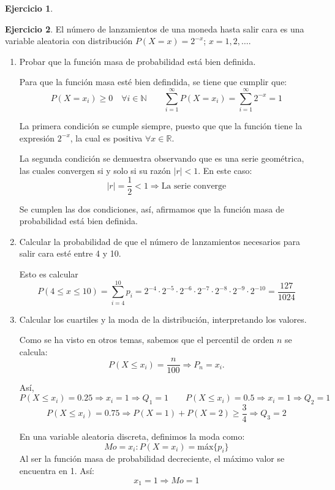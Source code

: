 \documentclass[a4paper, 12pt]{article}
\theoremstyle{definition}
\newtheorem{ej}{Ejercicio}
\begin{document}
\newpage

\begin{ej}

\end{ej}

\begin{ej}
El número de lanzamientos de una moneda hasta salir cara es una variable aleatoria con distribución \(P(X=x) = 2^{-x}\); \(x=1,2,\dotsc\).

\begin{enumerate}[label=\textit{\alph*)}]
	\item Probar que la función masa de probabilidad está bien definida.
	
Para que la función masa esté bien defindida, se tiene que cumplir que:
\[
	P(X=x_i) \geq 0 \quad \forall i \in \mathbb{N} \qquad \sum_{i=1}^{\infty} P(X=x_i) = \sum_{i=1}^{\infty} 2^{-x} = 1
\]

La primera condición se cumple siempre, puesto que que la función tiene la expresión \(2^{-x}\), la cual es positiva \(\forall x \in \mathbb{R}\).

La segunda condición se demuestra observando que es una serie geométrica, las cuales convergen si y solo si su razón \(|r| < 1\). En este caso:
\[
	|r| = \frac{1}{2} < 1 \Rightarrow \text{La serie converge}
\]

Se cumplen las dos condiciones, así, afirmamos que la función masa de probabilidad está bien definida.

	\item Calcular la probabilidad de que el número de lanzamientos necesarios para salir cara esté entre 4 y 10.
	
Esto es calcular
\[
	P(4 \leq x \leq 10) = \sum_{i=4}^{10}p_i = 2^{-4} \cdot 2^{-5} \cdot 2^{-6} \cdot 2^{-7} \cdot 2^{-8} \cdot 2^{-9} \cdot 2^{-10} = \frac{127}{1024}
\]

	\item Calcular los cuartiles y la moda de la distribución, interpretando los valores.
	
Como se ha visto en otros temas, sabemos que el percentil de orden \(n\) se calcula:
\[
	P(X \leq x_i) = \frac{n}{100} \Rightarrow P_n = x_i.
\]

Así, 
\[
	P(X \leq x_i) = 0.25 \Rightarrow x_i = 1 \Rightarrow Q_1 = 1 \qquad P(X \leq x_i) = 0.5 \Rightarrow x_i = 1 \Rightarrow Q_2 = 1
\]
\[
	P(X \leq x_i) = 0.75 \Rightarrow P(X=1) + P(X=2) \geq \frac{3}{4} \Rightarrow Q_3 = 2
\]

En una variable aleatoria discreta, definimos la moda como:
\[
	Mo = x_i : P(X=x_i) = \text{máx} \{p_i\}
\]
Al ser la función masa de probabilidad decreciente, el máximo valor se encuentra en 1. Así:
\[
	x_1 = 1 \Rightarrow Mo = 1
\]


\end{enumerate}
\end{ej}
\end{document}
